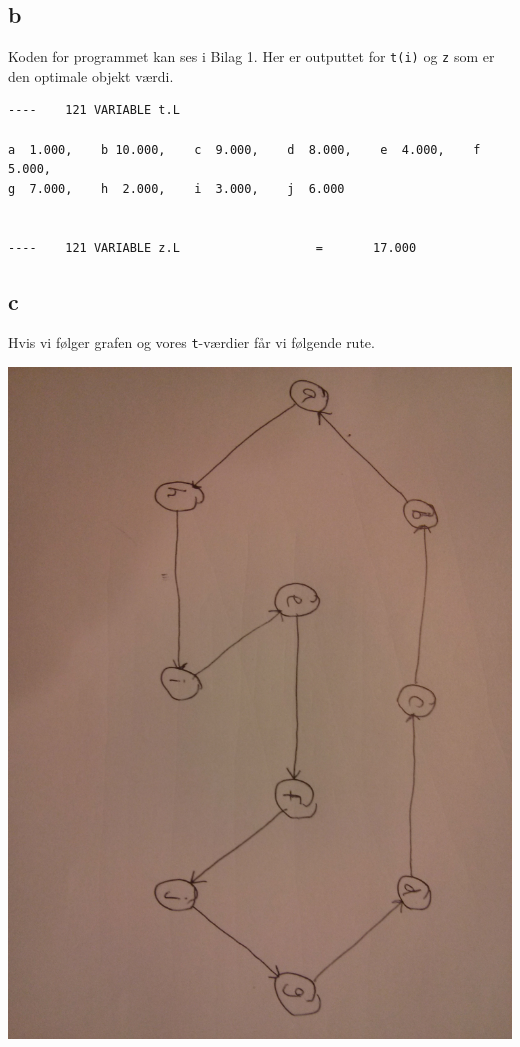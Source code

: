 \documentclass[a4paper]{article}
\begin{document}
\subsection*{b}
Koden for programmet kan ses i Bilag 1. Her er outputtet for \texttt{t(i)} og \texttt{z} som er den optimale objekt værdi.
\begin{verbatim}
----    121 VARIABLE t.L  

a  1.000,    b 10.000,    c  9.000,    d  8.000,    e  4.000,    f  5.000,   
g  7.000,    h  2.000,    i  3.000,    j  6.000


----    121 VARIABLE z.L                   =       17.000  
\end{verbatim}

\subsection*{c}
Hvis vi følger grafen og vores \texttt{t}-værdier får vi følgende rute.
\begin{center}
\includegraphics[scale=0.1, angle=90]{img33}
\end{center}
\end{document}
